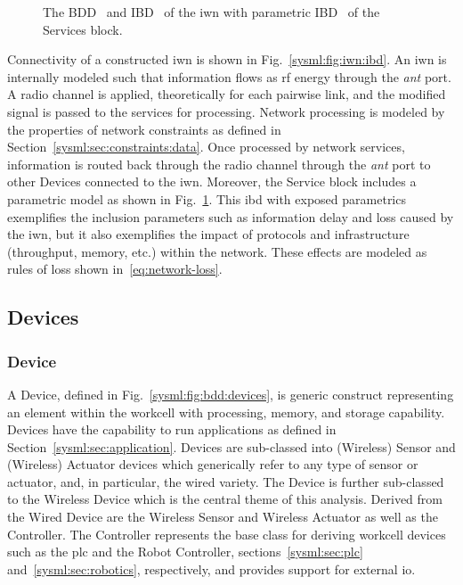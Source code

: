 \begin{figure}[ht]
	\caption{The BDD~\protect{} and IBD~\protect{} of the \gls{iwn} with parametric IBD~\protect{} of the Services block.}
	\label{sysml:fig:iwn:ibd:full}
\end{figure}

Connectivity of a constructed \gls{iwn} is shown in Fig.~\ref{sysml:fig:iwn:ibd}.  An \gls{iwn} is internally modeled such that information flows as \gls{rf} energy through the \textit{ant} port.  A radio channel is applied, theoretically for each pairwise link, and the modified signal is passed to the services for processing.  Network processing is modeled by the properties of network constraints as defined in Section~\ref{sysml:sec:constraints:data}.  Once processed by network services, information is routed back through the radio channel through the \textit{ant} port to other Devices connected to the \gls{iwn}.  Moreover, the Service block includes a parametric model as shown in Fig.~\ref{sysml:fig:iwn:ibd:full}. This \gls{ibd} with exposed parametrics exemplifies the inclusion parameters such as information delay and loss caused by the \gls{iwn}, but it also exemplifies the impact of protocols and infrastructure (throughput, memory, etc.) within the network.  These effects are modeled as rules of loss shown in~\eqref{eq:network-loss}.

\subsection{Devices}\label{sysml:sec:devices}

\subsubsection{Device}\label{sysml:sec:devices:device}

A Device, defined in Fig.~\ref{sysml:fig:bdd:devices}, is generic construct representing an element within the workcell with processing, memory, and storage capability. Devices have the capability to run applications as defined in Section~\ref{sysml:sec:application}.  Devices are sub-classed into (Wireless) Sensor and (Wireless) Actuator devices which generically refer to any type of sensor or actuator, and, in particular, the wired variety.  The Device is further sub-classed to the Wireless Device which is the central theme of this analysis.  Derived from the Wired Device are the Wireless Sensor and Wireless Actuator as well as the Controller.  The Controller represents the base class for deriving workcell devices such as the \gls{plc} and the Robot Controller, sections~\ref{sysml:sec:plc} and~\ref{sysml:sec:robotics}, respectively, and provides support for external \gls{io}.

